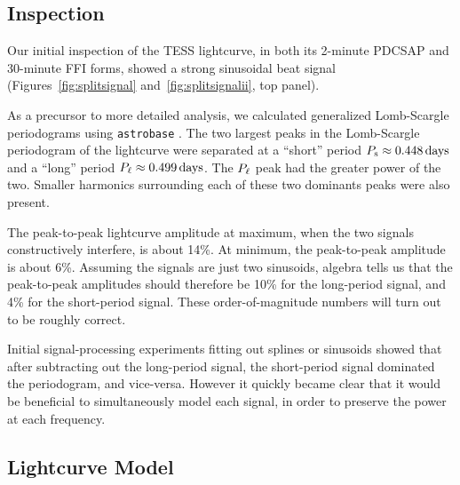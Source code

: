 \documentclass[12pt,twocolumn,tighten]{aastex62}
\begin{document}
\subsection{Inspection}

Our initial inspection of the TESS lightcurve, in both its 2-minute
PDCSAP and 30-minute FFI forms, showed a strong sinusoidal beat signal
(Figures~\ref{fig:splitsignal} and~\ref{fig:splitsignalii}, top
panel).

As a precursor to more detailed analysis, we calculated generalized
Lomb-Scargle periodograms using \texttt{astrobase}
\citep{lomb_1976,scargle_studies_1982,vanderplas_periodograms_2015,bhatti_astrobase_2018}.
The two largest peaks in the Lomb-Scargle periodogram of the
lightcurve were separated at a ``short'' period $P_{\rm s}
\approx 0.448\,{\rm days}$ and a ``long'' period $P_{\rm \ell} \approx
0.499\,{\rm days}$.  The $P_{\rm \ell}$ peak had the greater power of
the two.  Smaller harmonics surrounding each of these two dominants
peaks were also present.


The peak-to-peak lightcurve amplitude at maximum, when the two signals
constructively interfere, is about 14\%.  At minimum, the peak-to-peak
amplitude is about 6\%.  Assuming the signals are just two sinusoids,
algebra tells us that the peak-to-peak amplitudes should therefore be
10\% for the long-period signal, and 4\% for the short-period signal.
These order-of-magnitude numbers will turn out to be roughly correct.

Initial signal-processing experiments fitting out splines or sinusoids
showed that after subtracting out the long-period signal, the
short-period signal dominated the periodogram, and vice-versa.
However it quickly became clear that it would be beneficial to
simultaneously model each signal, in order to preserve the
power at each frequency.




\subsection{Lightcurve Model}
\end{document}
